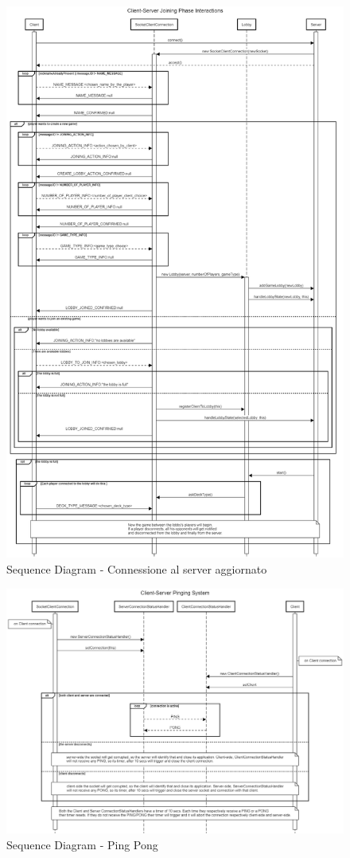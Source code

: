 \documentclass[a4paper, 12pt]{article}
\begin{document}
	\newpage
	\begin{figure}[h!]
		\centering
		\includegraphics[scale=0.27]{ClientServerJoiningPhaseInteraction1.png}
		\caption{Sequence Diagram - Connessione al server aggiornato}
	\end{figure}
	\newpage
	\begin{figure}[h!]
		\centering
		\includegraphics[scale=0.3]{PingingSystem.png}
		\caption{Sequence Diagram - Ping Pong}
	\end{figure}
	
\end{document}
